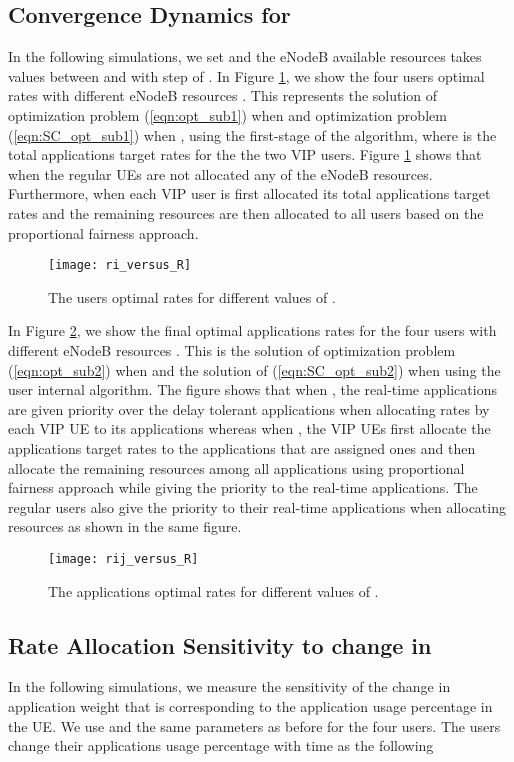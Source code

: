 \documentclass[journal]{IEEEtran} 				\IEEEoverridecommandlockouts 						\usepackage{amsmath,amssymb}
\begin{document}
\subsection{Convergence Dynamics for }
In the following simulations, we set  and the eNodeB available resources  takes values between  and  with step of . In Figure \ref{fig:ri_versus_R}, we show the four users optimal rates  with different eNodeB resources . This represents the solution of optimization problem (\ref{eqn:opt_sub1}) when  and optimization problem (\ref{eqn:SC_opt_sub1}) when , using the first-stage of the algorithm, where  is the total applications target rates for the the two VIP users. Figure \ref{fig:ri_versus_R} shows that when  the regular UEs are not allocated any of the eNodeB resources. Furthermore, when  each VIP user is first allocated its total applications target rates and the remaining resources are then allocated to all users based on the proportional fairness approach.

\begin{figure}
\centering
\texttt{[image: ri\_versus\_R]}
\caption{The users optimal rates  for different values of .}
\label{fig:ri_versus_R}
\end{figure}
In Figure \ref{fig:rij_versus_R}, we show the final optimal  applications rates  for the four users with different eNodeB resources . This is the solution of optimization problem (\ref{eqn:opt_sub2}) when  and the solution of (\ref{eqn:SC_opt_sub2}) when  using the user internal algorithm. The figure shows that when , the real-time applications are given priority over the delay tolerant applications when allocating rates by each VIP UE to its applications whereas when , the VIP UEs first allocate the applications target rates to the applications that are assigned ones and then allocate the remaining resources among all applications using proportional fairness approach while giving the priority to the real-time applications. The regular users also give the priority to their real-time applications when allocating resources as shown in the same figure.
\begin{figure}
\centering
\texttt{[image: rij\_versus\_R]}
\caption{The applications optimal rates  for different values of .}
\label{fig:rij_versus_R}
\end{figure}
\subsection{Rate Allocation Sensitivity to change in }
In the following simulations, we measure the sensitivity of the change in application weight that is corresponding to the application usage percentage in the UE. We use  and the same parameters as before for the four users. The users change their applications usage percentage with time as the following
\end{document}
